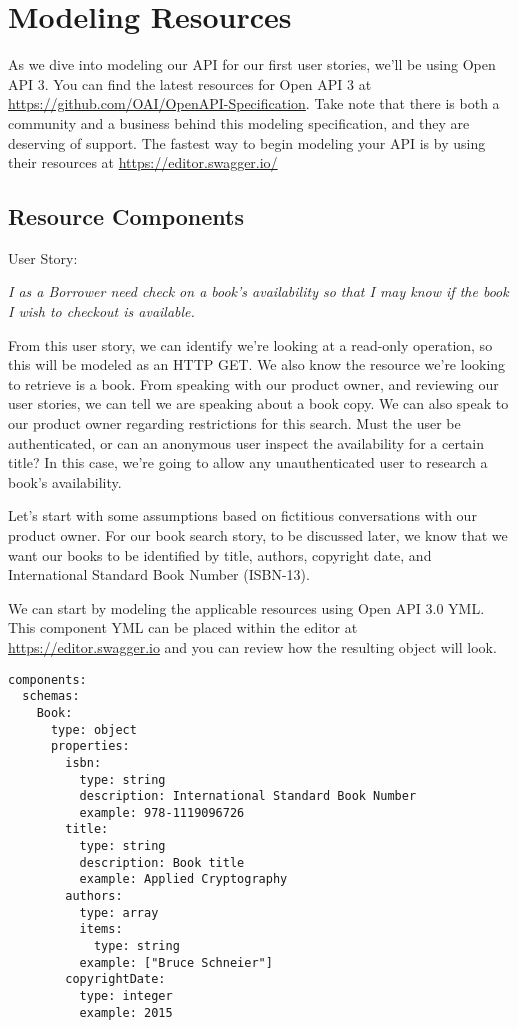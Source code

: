 \chapter{Modeling Resources}

As we dive into modeling our API for our first user stories, we'll be using Open API 3.  You can find the latest resources for Open API 3 at \url{https://github.com/OAI/OpenAPI-Specification}.  Take note that there is both a community and a business behind this modeling specification, and they are deserving of support.  The fastest way to begin modeling your API is by using their resources at \url{https://editor.swagger.io/}

\section{Resource Components}

User Story:

\textit{I as a Borrower need check on a book's availability so that I may know if the book I wish to checkout is available.}

From this user story, we can identify we're looking at a read-only operation, so this will be modeled as an HTTP GET.  We also know the resource we're looking to retrieve is a book.  From speaking with our product owner, and reviewing our user stories, we can tell we are speaking about a book copy.  We can also speak to our product owner regarding restrictions for this search.  Must the user be authenticated, or can an anonymous user inspect the availability for a certain title?  In this case, we're going to allow any unauthenticated user to research a book's availability.

Let's start with some assumptions based on fictitious conversations with our product owner.  For our book search story, to be discussed later, we know that we want our books to be identified by title, authors, copyright date, and International Standard Book Number (ISBN-13).

\begin{minipage}{\linewidth}
We can start by modeling the applicable resources using Open API 3.0 YML.  This component YML can be placed within the editor at \url{https://editor.swagger.io} and you can review how the resulting object will look.
\begin{code}
\begin{lstlisting}[belowskip=-\baselineskip]
components:
  schemas:
    Book:
      type: object
      properties:
        isbn:
          type: string
          description: International Standard Book Number
          example: 978-1119096726
        title:
          type: string
          description: Book title
          example: Applied Cryptography
        authors:
          type: array
          items:
            type: string
          example: ["Bruce Schneier"]
        copyrightDate:
          type: integer
          example: 2015
\end{lstlisting}
\end{code}
\end{minipage}

